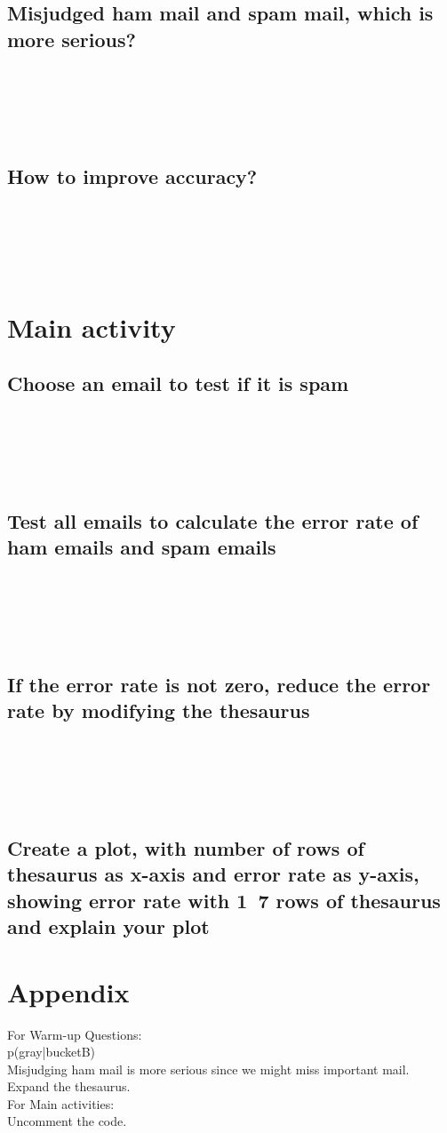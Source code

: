 \documentclass[11pt,a4paper]{article}
\begin{document}
\subsection{Misjudged ham mail and spam mail, which is more serious?}
~\\~\\~\\~\\
\subsection{How to improve accuracy?}
~\\~\\~\\~\\
\section{Main activity}
\subsection{Choose an email to test if it is spam}
~\\~\\~\\~\\
\subsection{Test all emails to calculate the error rate of ham emails and spam emails}
~\\~\\~\\~\\
\subsection{If the error rate is not zero, reduce the error rate by modifying the thesaurus}
~\\~\\~\\~\\
\subsection{Create a plot, with number of rows of thesaurus as x-axis and error rate as y-axis, showing error rate with 1~7 rows of thesaurus and explain your plot}

\section{Appendix}
For Warm-up Questions:\\
p(gray|bucketB)\\
Misjudging ham mail is more serious since we might miss important mail.\\
Expand the thesaurus.\\
For Main activities:\\
Uncomment the code.
\end{document}
